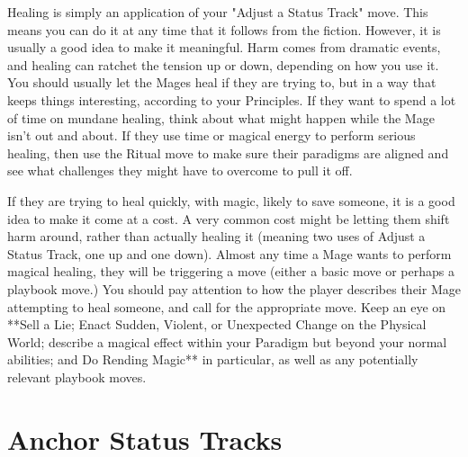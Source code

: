 \documentclass[
  oneside,
  statementpaper,
  9pt]{memoir}
\begin{document}
\begin{MC}

Healing is simply an application of your "Adjust a Status Track" move. This means you can do it at any time that it follows from the fiction. However, it is usually a good idea to make it meaningful. Harm comes from dramatic events, and healing can ratchet the tension up or down, depending on how you use it. You should usually let the Mages heal if they are trying to, but in a way that keeps things interesting, according to your Principles. If they want to spend a lot of time on mundane healing, think about what might happen while the Mage isn't out and about. If they use time or magical energy to perform serious healing, then use the Ritual move to make sure their paradigms are aligned and see what challenges they might have to overcome to pull it off.

If they are trying to heal quickly, with magic, likely to save someone, it is a good idea to make it come at a cost. A very common cost might be letting them shift harm around, rather than actually healing it (meaning two uses of Adjust a Status Track, one up and one down). Almost any time a Mage wants to perform magical healing, they will be triggering a move (either a basic move or perhaps a playbook move.) You should pay attention to how the player describes their Mage attempting to heal someone, and call for the appropriate move. Keep an eye on **Sell a Lie; Enact Sudden, Violent, or Unexpected Change on the Physical World; describe a magical effect within your Paradigm but beyond your normal abilities; and Do Rending Magic** in particular, as well as any potentially relevant playbook moves.

\end{MC}

\hypertarget{anchor-status-tracks}{%
\section{Anchor Status Tracks}\label{anchor-status-tracks}}
\end{document}
